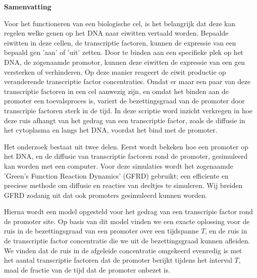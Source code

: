 \begin{center}
{\center \bf Samenvatting}
\end{center}

Voor het functioneren van een biologische cel, is het belangrijk dat deze kan regelen welke genen op het DNA naar eiwitten vertaald worden. Bepaalde eiwitten in deze cellen, de transcriptie factoren, kunnen de expressie van een bepaald gen 'aan' of 'uit' zetten. Door te binden aan een specifieke plek op het DNA, de zogenaamde promotor, kunnen deze eiwitten de expressie van een gen versterken of verhinderen. Op deze manier reageert de eiwit productie op veranderende transcriptie factor concentraties. Omdat er maar een paar van deze transcriptie factoren in een cel aanwezig zijn, en omdat het binden aan de promoter een toevalsproces is, variert de bezettingsgraad van de promoter door transcripie factoren sterk in de tijd. In deze scriptie word inzicht verkregen in hoe deze ruis afhangt van het gedrag van een transcriptie factor, zoals de diffusie in het cytoplasma en langs het DNA, voordat het bind met de promoter. 

Het onderzoek bestaat uit twee delen. Eerst wordt bekeken hoe een promoter op het DNA, en de diffusie van transcriptie factoren rond de promoter, gesimuleerd kan worden met een computer. Voor deze simulaties wordt het zogenaamde 'Green's Function Reaction Dynamics' (GFRD) gebruikt; een efficiente en preciese methode om diffusie en reacties van deeltjes te simuleren. Wij breiden GFRD zodanig uit dat ook promoters gesimuleerd kunnen worden.

Hierna wordt een model opgesteld voor het gedrag van een transcripie factor rond de promoter site. Op basis van dit model vinden we een exacte oplossing voor de ruis in de bezettingsgraad van een promoter over een tijdspanne $T$, en de ruis in de transcriptie factor concentratie die we uit de bezettingsgraad kunnen afleiden. We vinden dat de ruis in de afgeleide concentratie omgekeerd evenredig is met het aantal transcriptie factoren dat de promoter berijkt tijdens het interval $T$, maal de fractie van de tijd dat de promoter onbezet is. 